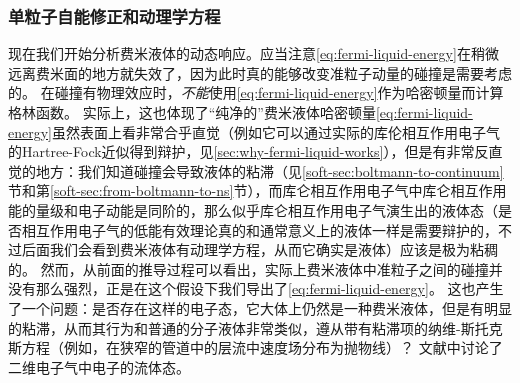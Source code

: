 \subsubsection{单粒子自能修正和动理学方程}

现在我们开始分析费米液体的动态响应。应当注意\eqref{eq:fermi-liquid-energy}在稍微远离费米面的地方就失效了，因为此时真的能够改变准粒子动量的碰撞是需要考虑的。
在碰撞有物理效应时，\emph{不能}使用\eqref{eq:fermi-liquid-energy}作为哈密顿量而计算格林函数。
实际上，这也体现了“纯净的”费米液体哈密顿量\eqref{eq:fermi-liquid-energy}虽然表面上看非常合乎直觉（例如它可以通过实际的库伦相互作用电子气的Hartree-Fock近似得到辩护，见\autoref{sec:why-fermi-liquid-works}），但是有非常反直觉的地方：我们知道碰撞会导致液体的粘滞（见\ref{soft-sec:boltmann-to-continuum}节和第\ref{soft-sec:from-boltmann-to-ns}节），而库仑相互作用电子气中库仑相互作用能的量级和电子动能是同阶的，那么似乎库仑相互作用电子气演生出的液体态（是否相互作用电子气的低能有效理论真的和通常意义上的液体一样是需要辩护的，不过后面我们会看到费米液体有动理学方程，从而它确实是液体）应该是极为粘稠的。
然而，从前面的推导过程可以看出，实际上费米液体中准粒子之间的碰撞并没有那么强烈，正是在这个假设下我们导出了\eqref{eq:fermi-liquid-energy}。
这也产生了一个问题：是否存在这样的电子态，它大体上仍然是一种费米液体，但是有明显的粘滞，从而其行为和普通的分子液体非常类似，遵从带有粘滞项的纳维-斯托克斯方程（例如，在狭窄的管道中的层流中速度场分布为抛物线）？
文献\cite{Chandra_2019}中讨论了二维电子气中电子的流体态。


